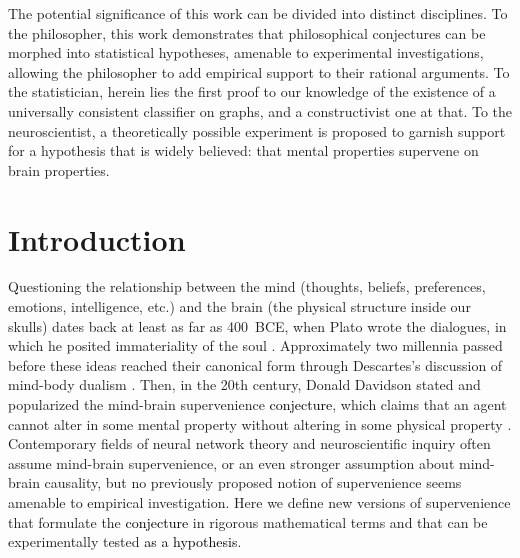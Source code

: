 \documentclass[10pt]{article}
\providecommand{\tr}[1]{\textcolor{black}{#1}}
\begin{document}
The potential significance of this work can be divided into distinct disciplines.  To the philosopher, this work demonstrates that philosophical conjectures can be morphed into statistical hypotheses, amenable to experimental investigations, allowing the philosopher to add empirical support to their rational arguments.  To the statistician, herein lies the first proof to our knowledge of the existence of a universally consistent classifier on graphs, and a constructivist one at that.  To the neuroscientist, a theoretically possible experiment is proposed to garnish support for a hypothesis that is widely believed: that mental properties supervene on brain properties.


\section*{Introduction}

Questioning the relationship between the mind (thoughts, beliefs, preferences, emotions, intelligence, etc.) and the brain (the physical structure inside our skulls) dates back at least as far as 400~BCE, when Plato wrote the dialogues, in which he posited immateriality of the soul \cite{Plato97}. Approximately two millennia passed before these ideas reached their canonical form through Descartes's discussion of mind-body dualism \cite{Descartes1641}. Then, in the 20th century, Donald Davidson stated and popularized the mind-brain supervenience \tr{conjecture}, which claims that an agent cannot alter in some mental property without altering in some physical property \cite{Davidson70}. Contemporary fields of neural network theory and neuroscientific inquiry often assume mind-brain supervenience, or an even stronger assumption about mind-brain causality, but no previously proposed notion of supervenience seems amenable to empirical investigation. Here we define new versions of supervenience that formulate the \tr{conjecture} in rigorous mathematical terms and that can be experimentally tested \tr{as a hypothesis}.
\end{document}
